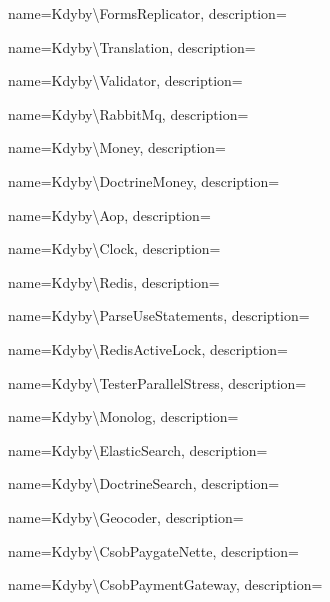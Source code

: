  {
  name={Kdy\-by\textbackslash{}Forms\-Re\-pli\-ca\-tor},
  description={} }

 {
  name={Kdy\-by\textbackslash{}Tran\-sla\-tion},
  description={} }

 {
  name={Kdy\-by\textbackslash{}Va\-li\-da\-tor},
  description={} }

 {
  name={Kdy\-by\textbackslash{}Ra\-bbit\-Mq},
  description={} }

 {
  name={Kdy\-by\textbackslash{}Mo\-ney},
  description={} }

 {
  name={Kdy\-by\textbackslash{}Doc\-tri\-ne\-Mo\-ney},
  description={} }

 {
  name={Kdy\-by\textbackslash{}Aop},
  description={} }

 {
  name={Kdy\-by\textbackslash{}Clo\-ck},
  description={} }

 {
  name={Kdy\-by\textbackslash{}Re\-di\-s},
  description={} }

 {
  name={Kdy\-by\textbackslash{}Par\-se\-Use\-Sta\-te\-men\-ts},
  description={} }

 {
  name={Kdy\-by\textbackslash{}Re\-dis\-Acti\-ve\-Lock},
  description={} }

 {
  name={Kdy\-by\textbackslash{}Tes\-ter\-Pa\-ra\-llel\-St\-ress},
  description={} }

 {
  name={Kdy\-by\textbackslash{}Mo\-no\-log},
  description={} }

 {
  name={Kdy\-by\textbackslash{}Elastic\-Sear\-ch},
  description={} }

 {
  name={Kdy\-by\textbackslash{}Doc\-tri\-ne\-Sear\-ch},
  description={} }

 {
  name={Kdy\-by\textbackslash{}Geo\-co\-der},
  description={} }

 {
  name={Kdy\-by\textbackslash{}Csob\-Pay\-gate\-Nette},
  description={} }

 {
  name={Kdy\-by\textbackslash{}Csob\-Pay\-me\-nt\-Ga\-te\-way},
  description={} }

